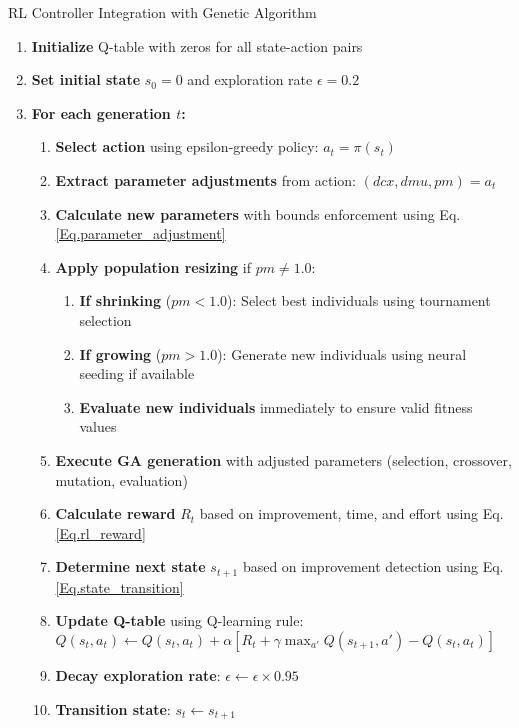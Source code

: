 \documentclass[12pt,a4paper]{article}
\begin{document}
\begin{algorithm}
\caption{RL Controller Integration with Genetic Algorithm}
\begin{enumerate}
\item \textbf{Initialize} Q-table with zeros for all state-action pairs
\item \textbf{Set initial state} $s_0 = 0$ and exploration rate $\epsilon = 0.2$
\item \textbf{For each generation $t$:}
    \begin{enumerate}
    \item \textbf{Select action} using epsilon-greedy policy: $a_t = \pi(s_t)$
    \item \textbf{Extract parameter adjustments} from action: $(dcx, dmu, pm) = a_t$
    \item \textbf{Calculate new parameters} with bounds enforcement using Eq. \ref{Eq.parameter_adjustment}
    \item \textbf{Apply population resizing} if $pm \neq 1.0$:
        \begin{enumerate}
        \item \textbf{If shrinking} ($pm < 1.0$): Select best individuals using tournament selection
        \item \textbf{If growing} ($pm > 1.0$): Generate new individuals using neural seeding if available
        \item \textbf{Evaluate new individuals} immediately to ensure valid fitness values
        \end{enumerate}
    \item \textbf{Execute GA generation} with adjusted parameters (selection, crossover, mutation, evaluation)
    \item \textbf{Calculate reward} $R_t$ based on improvement, time, and effort using Eq. \ref{Eq.rl_reward}
    \item \textbf{Determine next state} $s_{t+1}$ based on improvement detection using Eq. \ref{Eq.state_transition}
    \item \textbf{Update Q-table} using Q-learning rule: $Q(s_t, a_t) \leftarrow Q(s_t, a_t) + \alpha[R_t + \gamma \max_{a'} Q(s_{t+1}, a') - Q(s_t, a_t)]$
    \item \textbf{Decay exploration rate}: $\epsilon \leftarrow \epsilon \times 0.95$
    \item \textbf{Transition state}: $s_t \leftarrow s_{t+1}$
    \end{enumerate}
\end{enumerate}
\end{algorithm}
\end{document}
